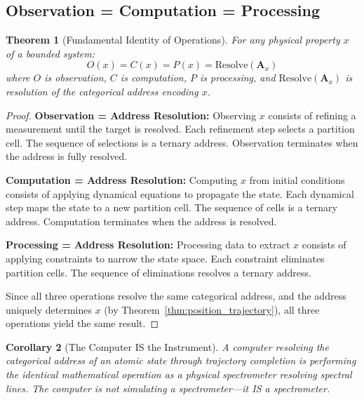 \documentclass[11pt,twocolumn,a4paper]{article}
\newtheorem{theorem}{Theorem}[section]
\newtheorem{corollary}[theorem]{Corollary}
\theoremstyle{definition}
\theoremstyle{remark}
\begin{document}
\subsection{Observation = Computation = Processing}

\begin{theorem}[Fundamental Identity of Operations]
\label{thm:ocp}
For any physical property $x$ of a bounded system:
\begin{equation}
O(x) = C(x) = P(x) = \mathrm{Resolve}(\mathbf{A}_x)
\end{equation}
where $O$ is observation, $C$ is computation, $P$ is processing, and $\mathrm{Resolve}(\mathbf{A}_x)$ is resolution of the categorical address encoding $x$.
\end{theorem}

\begin{proof}
\textbf{Observation = Address Resolution:} Observing $x$ consists of refining a measurement until the target is resolved. Each refinement step selects a partition cell. The sequence of selections is a ternary address. Observation terminates when the address is fully resolved.

\textbf{Computation = Address Resolution:} Computing $x$ from initial conditions consists of applying dynamical equations to propagate the state. Each dynamical step maps the state to a new partition cell. The sequence of cells is a ternary address. Computation terminates when the address is resolved.

\textbf{Processing = Address Resolution:} Processing data to extract $x$ consists of applying constraints to narrow the state space. Each constraint eliminates partition cells. The sequence of eliminations resolves a ternary address.

Since all three operations resolve the same categorical address, and the address uniquely determines $x$ (by Theorem~\ref{thm:position_trajectory}), all three operations yield the same result.
\end{proof}

\begin{corollary}[The Computer IS the Instrument]
A computer resolving the categorical address of an atomic state through trajectory completion is performing the identical mathematical operation as a physical spectrometer resolving spectral lines. The computer is not simulating a spectrometer---it IS a spectrometer.
\end{corollary}

\end{document}
